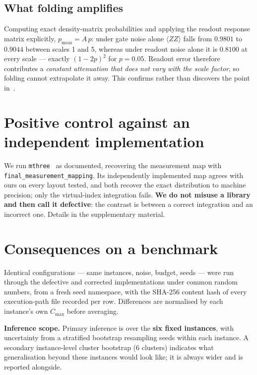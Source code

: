 \documentclass[10pt,conference]{IEEEtran}
\newcommand{\code}[1]{\texttt{\small #1}}
\begin{document}
\subsection{What folding amplifies}
Computing exact density-matrix probabilities and applying the readout response matrix explicitly,
$p_{\text{meas}}=A\,p$: under gate noise alone $\langle ZZ\rangle$ falls from $0.9801$ to $0.9044$
between scales 1 and 5, whereas under readout noise alone it is $0.8100$ at every scale --- exactly
$(1-2p)^2$ for $p=0.05$. Readout error therefore contributes a \emph{constant attenuation that does
not vary with the scale factor}, so folding cannot extrapolate it away. This confirms rather than
discovers the point in~\cite{majumdar2023}.

\section{Positive control against an independent implementation}\label{sec:control}
We run \code{mthree}~\cite{nation2021} as documented, recovering the measurement map with
\code{final\_measurement\_mapping}. Its independently implemented map agrees with ours on every
layout tested, and both recover the exact distribution to machine precision; only the virtual-index
integration fails. \textbf{We do not misuse a library and then call it defective}: the contrast is
between a correct integration and an incorrect one. Details in the supplementary material.

\section{Consequences on a benchmark}\label{sec:impact}
Identical configurations --- same instances, noise, budget, seeds --- were run through the defective
and corrected implementations under common random numbers, from a fresh seed namespace, with the
SHA-256 content hash of every execution-path file recorded per row. Differences are normalised by
each instance's own $C_{\max}$ before averaging.

\textbf{Inference scope.} Primary inference is over the \textbf{six fixed instances}, with
uncertainty from a stratified bootstrap resampling seeds within each instance. A secondary
instance-level cluster bootstrap (6 clusters) indicates what generalisation beyond these instances
would look like; it is always wider and is reported alongside.

\begin{table}[t]
\caption{Implementation contrast, paired within cell under common random numbers, normalised by
$C_{\max}$. \emph{Directionality} is $|\text{mean signed}|/\text{mean}|\cdot|$: values near 1 indicate
a one-directional shift, not cancellation. The cluster interval is the weaker generalisation-oriented
interval. $p_{\mathrm{BH}}$ is adjusted within the declared family; BH adjustment does not repair a
sampling model and is applied only after the estimand and dependence structure are fixed.}
\label{tab:f1}
\centering\small

\end{table}
\end{document}
